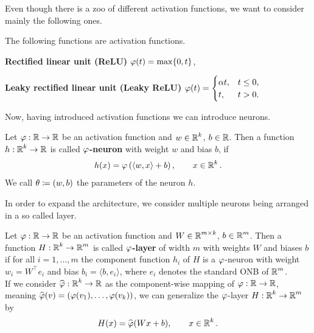 Even though there is a zoo of different activation functions, we want to consider mainly the following ones.


\begin{example}
The following functions are activation functions.
\begin{mydescription}{}
\item[\textbf{Rectified linear unit (ReLU)}] $\operatorname{\varphi}(t) = \max\{0, t\}$,
\item[\textbf{Leaky rectified linear unit (Leaky ReLU)}] $\displaystyle \operatorname{\varphi}(t) = \begin{cases}
\alpha t, 	& t \leq 0,\\
t,		& t > 0.
\end{cases}$
\end{mydescription}
\end{example}


Now, having introduced activation functions we can introduce neurons.


\begin{definition}
Let $\operatorname{\varphi}: \operatorname{\mathbb{R}} \to \operatorname{\mathbb{R}}$ be an activation function and $w\in \operatorname{\mathbb{R}}^k$, $b \in \operatorname{\mathbb{R}}$. Then a function $h: \operatorname{\mathbb{R}}^k \to \operatorname{\mathbb{R}}$ is called \textbf{$\operatorname{\varphi}$-neuron} with weight $w$ and bias $b$, if
\begin{align}\label{def_neuron}
h(x) = \operatorname{\varphi} \left(\langle w, x \rangle + b \right), \qquad x \in \operatorname{\mathbb{R}}^k.
\end{align}
We call $\theta \coloneqq (w, b)$ the parameters of the neuron $h$.
\end{definition}


In order to expand the architecture, we consider multiple neurons being arranged in a so called layer.


\begin{definition}\label{def_layer}
Let $\operatorname{\varphi}: \operatorname{\mathbb{R}} \to \operatorname{\mathbb{R}}$ be an activation function and $W \in \operatorname{\mathbb{R}}^{m\times k}$, $b\in \operatorname{\mathbb{R}}^m$. Then a function $H:\operatorname{\mathbb{R}}^k \to \operatorname{\mathbb{R}}^m$ is called \textbf{$\operatorname{\varphi}$-layer} of width $m$ with weights $W$ and biases $b$ if for all $i=1,\ldots,m$ the component function $h_i$ of $H$ is a $\operatorname{\varphi}$-neuron with weight $w_i = W^\top e_i$ and bias $b_i = \langle b, e_i \rangle$, where $e_i$ denotes the standard ONB of $\operatorname{\mathbb{R}}^m$.\\
If we consider $\widehat{\operatorname{\varphi}}: \operatorname{\mathbb{R}}^k \to \operatorname{\mathbb{R}}$ as the component-wise mapping of $\operatorname{\varphi}:\operatorname{\mathbb{R}}\to \operatorname{\mathbb{R}}$, meaning $\widehat{\operatorname{\varphi}}(v) = (\operatorname{\varphi}(v_1), \ldots, \operatorname{\varphi}(v_k))$, we can generalize the $\operatorname{\varphi}$-layer $H:\operatorname{\mathbb{R}}^k \to \operatorname{\mathbb{R}}^m$ by
\begin{align}
H(x) = \widehat{\operatorname{\varphi}}(Wx + b), \qquad x \in \operatorname{\mathbb{R}} ^k.
\end{align}
\end{definition}


